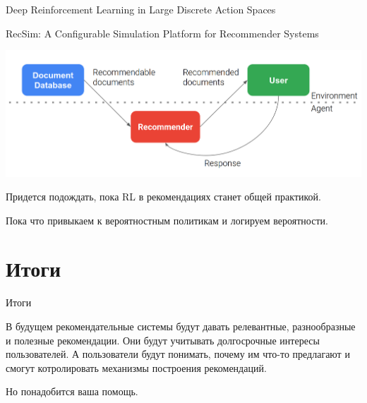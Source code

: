 \documentclass[11pt,aspectratio=169]{beamer}
\begin{document}
\begin{frame}{Deep Reinforcement Learning in Large Discrete Action Spaces \cite{DDPG}}
\end{frame}

\begin{frame}{RecSim: A Configurable Simulation Platform for Recommender Systems \cite{RECSIM}}

\begin{center}
\includegraphics[scale=0.2]{images/recsim.png}
\end{center}

\end{frame}

\begin{frame}

\begin{tcolorbox}[colback=warn!5,colframe=warn!80,title=]
Придется подождать, пока RL в рекомендациях станет общей практикой.
\end{tcolorbox}

\vfill

\begin{tcolorbox}[colback=info!5,colframe=info!80,title=]
Пока что привыкаем к вероятностным политикам и логируем вероятности.
\end{tcolorbox}

\end{frame}

\section{Итоги}

\begin{frame}{Итоги}

\begin{tcolorbox}[colback=info!5,colframe=info!80,title=]
В будущем рекомендательные системы будут давать релевантные, разнообразные и полезные рекомендации. Они будут учитывать долгосрочные интересы пользователей. А пользователи будут понимать, почему им что-то предлагают и смогут котролировать механизмы построения рекомендаций.
\end{tcolorbox}

\begin{tcolorbox}[colback=info!5,colframe=info!80,title=]
Но понадобится ваша помощь.
\end{tcolorbox}

\end{frame}
\end{document}
